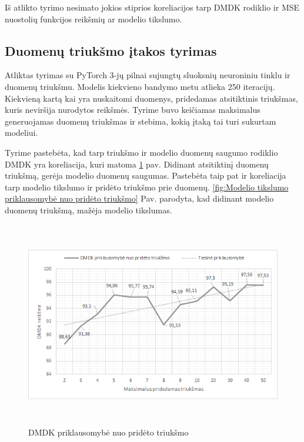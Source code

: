 \documentclass{VUMIFInfBakalaurinis}
\begin{document}
\par Iš atlikto tyrimo nesimato jokios stiprios koreliacijos tarp DMDK rodiklio ir MSE nuostolių funkcijos reikšmių ar modelio tikslumo.

\subsection{Duomenų triukšmo įtakos tyrimas}

\par Atliktas tyrimas su PyTorch 3-jų pilnai sujungtų sluoksnių neuroniniu tinklu ir duomenų triukšmu. Modelis kiekvieno bandymo metu atlieka 250 iteracijų. Kiekvieną kartą kai yra nuskaitomi duomenys, pridedamas atsitiktinis triukšmas, kuris neviršija nurodytos reikšmės. Tyrime buvo keičiamas maksimalus generuojamas duomenų triukšmas ir stebima, kokią įtaką tai turi sukurtam modeliui.
\par Tyrime pastebėta, kad tarp triukšmo ir modelio duomenų saugumo rodiklio DMDK yra koreliacija, kuri matoma \ref{fig:DMDK priklausomybė nuo pridėto triukšmo} pav. Didinant atsitiktinį duomenų triukšmą, gerėja modelio duomenų saugumas. Pastebėta taip pat ir koreliacija tarp modelio tikslumo ir pridėto triukšmo prie duomenų. \ref{fig:Modelio tikslumo priklausomybė nuo pridėto triukšmo} Pav. parodyta, kad didinant modelio duomenų triukšmą, mažėja modelio tikslumas.

\begin{figure}[h]
  \centering
  \includegraphics[width=13cm,height=9cm,keepaspectratio]{img/tr_tyr_dmdk.png}
  \caption{DMDK priklausomybė nuo pridėto triukšmo}
  \label{fig:DMDK priklausomybė nuo pridėto triukšmo}
\end{figure}
\clearpage
\end{document}
